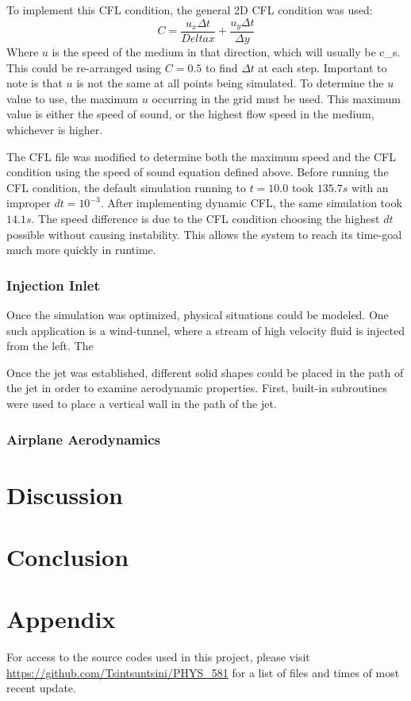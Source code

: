 \documentclass[twocolumn]{article}
\begin{document}
To implement this CFL condition, the general 2D CFL condition was used:
\begin{equation}
C = \frac{u_x \Delta t}{Delta x} + \frac{u_y \Delta t}{\Delta y}
\end{equation}
Where $u$ is the speed of the medium in that direction, which will usually be c_s. This could be re-arranged using $C=0.5$ to find $\Delta t$ at each step. Important to note is that $u$ is not the same at all points being simulated. To determine the $u$ value to use, the maximum $u$ occurring in the grid must be used. This maximum value is either the speed of sound, or the highest flow speed in the medium, whichever is higher. 

The CFL file was modified to determine both the maximum speed and the CFL condition using the speed of sound equation defined above. Before running the CFL condition, the default simulation running to $t=10.0$ took $135.7s$ with an improper $dt=10^{-3}$. After implementing dynamic CFL, the same simulation took $14.1s$. The speed difference is due to the CFL condition choosing the highest $dt$ possible without causing instability. This allows the system to reach its time-goal much more quickly in runtime. 

\subsubsection{Injection Inlet}
Once the simulation was optimized, physical situations could be modeled. One such application is a wind-tunnel, where a stream of high velocity fluid is injected from the left. The 


Once the jet was established, different solid shapes could be placed in the path of the jet in order to examine aerodynamic properties. First, built-in subroutines were used to place a vertical wall in the path of the jet. 

\subsubsection{Airplane Aerodynamics}


\section{Discussion}

\section{Conclusion}


\section{Appendix}
For access to the source codes used in this project, please visit \url{https://github.com/Tsintsuntsini/PHYS_581} for a list of files and times of most recent update.
	
\end{document}
